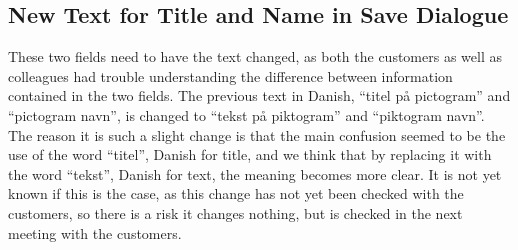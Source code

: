\subsection{New Text for Title and Name in Save Dialogue}
These two fields need to have the text changed, as both the customers as well as colleagues had trouble understanding the difference between information contained in the two fields.
The previous text in Danish, ``titel på pictogram'' and ``pictogram navn'', is changed to ``tekst på piktogram'' and ``piktogram navn''. 
The reason it is such a slight change is that the main confusion seemed to be the use of the word ``titel'', Danish for title, and we think that by replacing it with the word ``tekst'', Danish for text, the meaning becomes more clear. 
It is not yet known if this is the case, as this change has not yet been checked with the customers, so there is a risk it changes nothing, but is checked in the next meeting with the customers.